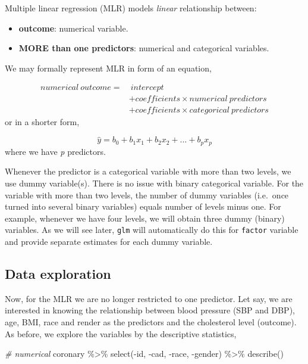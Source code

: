\documentclass[
  10pt,
]{krantz}
\newenvironment{Shaded}{\begin{snugshade}}{\end{snugshade}}
\newcommand{\CommentTok}[1]{\textcolor[rgb]{0.56,0.35,0.01}{\textit{#1}}}
\newcommand{\FunctionTok}[1]{\textcolor[rgb]{0.00,0.00,0.00}{#1}}
\newcommand{\NormalTok}[1]{#1}
\newcommand{\SpecialCharTok}[1]{\textcolor[rgb]{0.00,0.00,0.00}{#1}}
\providecommand{\tightlist}{%
  \setlength{\itemsep}{0pt}\setlength{\parskip}{0pt}}
\begin{document}
Multiple linear regression (MLR) models \emph{linear} relationship between:

\begin{itemize}
\tightlist
\item
  \textbf{outcome}: numerical variable.
\item
  \textbf{MORE than one predictors}: numerical and categorical variables.
\end{itemize}

We may formally represent MLR in form of an equation,

\[\begin{aligned}
numerical\ outcome = &\ intercept \\
& + coefficients \times numerical\ predictors \\
& + coefficients \times categorical\ predictors
\end{aligned}\]
or in a shorter form,

\[\hat y = b_0 + b_1x_1 + b_2x_2 + ... + b_px_p\]
where we have \emph{p} predictors.

Whenever the predictor is a categorical variable with more than two levels, we use dummy variable(s). There is no issue with binary categorical variable. For the variable with more than two levels, the number of dummy variables (i.e.~once turned into several binary variables) equals number of levels minus one. For example, whenever we have four levels, we will obtain three dummy (binary) variables. As we will see later, \texttt{glm} will automatically do this for \texttt{factor} variable and provide separate estimates for each dummy variable.

\hypertarget{data-exploration-1}{%
\subsection{Data exploration}\label{data-exploration-1}}

Now, for the MLR we are no longer restricted to one predictor. Let say, we are interested in knowing the relationship between blood pressure (SBP and DBP), age, BMI, race and render as the predictors and the cholesterol level (outcome). As before, we explore the variables by the descriptive statistics,

\begin{Shaded}
\begin{Highlighting}[]
\CommentTok{\# numerical}
\NormalTok{coronary }\SpecialCharTok{\%\textgreater{}\%} \FunctionTok{select}\NormalTok{(}\SpecialCharTok{{-}}\NormalTok{id, }\SpecialCharTok{{-}}\NormalTok{cad, }\SpecialCharTok{{-}}\NormalTok{race, }\SpecialCharTok{{-}}\NormalTok{gender) }\SpecialCharTok{\%\textgreater{}\%} \FunctionTok{describe}\NormalTok{()}
\end{Highlighting}
\end{Shaded}
\end{document}
